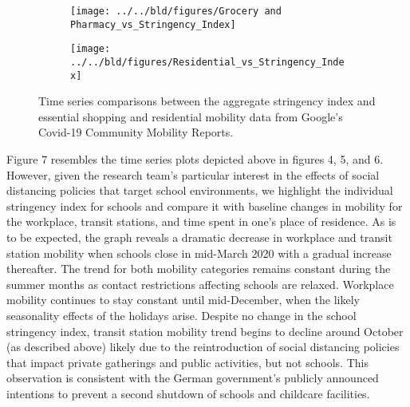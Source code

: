 \begin{figure}[H]
     \centering
     \begin{subfigure}[b]{\textwidth}
         \centering
         \texttt{[image: ../../bld/figures/Grocery and Pharmacy\_vs\_Stringency\_Index]}
         \caption{}
         \label{fig:essentialshopping}
     \end{subfigure}
     \hfill
     \begin{subfigure}[b]{\textwidth}
         \centering
         \texttt{[image: ../../bld/figures/Residential\_vs\_Stringency\_Index]}
         \caption{}
         \label{fig:residential}
     \end{subfigure}
        \caption{Time series comparisons between the aggregate stringency index and essential shopping and residential mobility data from Google's Covid-19 Community Mobility Reports.}
         \label{fig:four graphs}
\end{figure}

Figure 7 resembles the time series plots depicted above in figures 4, 5, and 6. However, given the research team’s particular interest in the effects of social distancing policies that target school environments, we highlight the individual stringency index for schools and compare it with baseline changes in mobility for the workplace, transit stations, and time spent in one’s place of residence. As is to be expected, the graph reveals a dramatic decrease in workplace and transit station mobility when schools close in mid-March 2020 with a gradual increase thereafter. The trend for both mobility categories remains constant during the summer months as contact restrictions affecting schools are relaxed. Workplace mobility continues to stay constant until mid-December, when the likely seasonality effects of the holidays arise. Despite no change in the school stringency index, transit station mobility trend begins to decline around October (as described above) likely due to the reintroduction of social distancing policies that impact private gatherings and public activities, but not schools. This observation is consistent with the German government’s publicly announced intentions to prevent a second shutdown of schools and childcare facilities.

